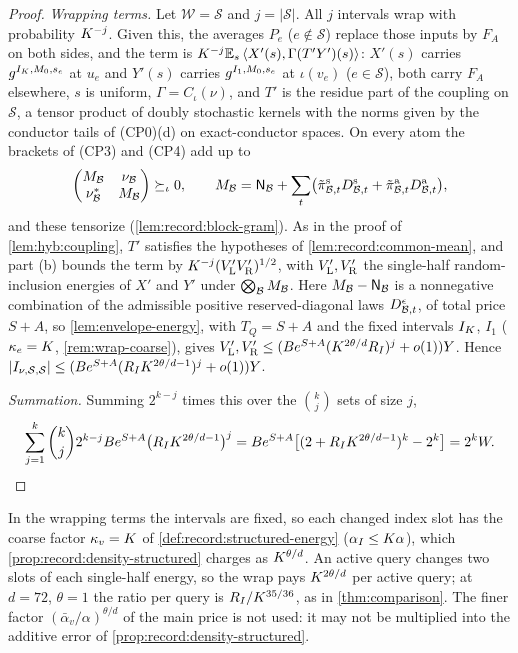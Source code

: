 \begin{proof}
\emph{Wrapping terms.} Let $\mathcal W=\mathcal S$ and $j=|\mathcal S|$. All
$j$ intervals wrap with probability $K^{-j}$. Given this, the averages
$P_e$ ($e\notin\mathcal S$) replace those inputs by $F_A$ on both sides, and
the term is $K^{-j}\mathbb E_s\left\langle X'(s),\Gamma(T'Y')(s)\right\rangle$: $X'(s)$ carries
$g^{I_K,M_0,s_e}$ at $u_e$ and $Y'(s)$ carries $g^{I_1,M_0,s_e}$ at
$\iota(v_e)$ ($e\in\mathcal S$), both carry $F_A$ elsewhere, $s$ is uniform,
$\Gamma=C_\iota(\nu)$, and $T'$ is the residue part of the coupling on
$\mathcal S$, a tensor product of doubly stochastic kernels with the norms
given by the conductor tails of (CP0)(d) on exact-conductor spaces. On every atom the brackets of
(CP3) and (CP4) add up to
\[
 \begin{pmatrix}M_\mathcal B&\nu_\mathcal B\\ \nu_\mathcal B^*&M_\mathcal B\end{pmatrix}
 \succeq_\iota0,\qquad
 M_\mathcal B=\mathsf N_\mathcal B+\sum_t\bigl(\tilde\pi^{\rm s}_{\mathcal B,t}D^{\rm s}_{\mathcal B,t}
 +\tilde\pi^{\rm a}_{\mathcal B,t}D^{\rm a}_{\mathcal B,t}\bigr),
\]
and these tensorize (\cref{lem:record:block-gram}). As in the proof of
\cref{lem:hyb:coupling}, $T'$ satisfies the hypotheses of
\cref{lem:record:common-mean}, and part (b) bounds the term by
$K^{-j}(V'_{\rm L}V'_{\rm R})^{1/2}$, with $V'_{\rm L},V'_{\rm R}$ the
single-half random-inclusion energies of $X'$ and $Y'$ under
$\bigotimes_\mathcal B M_\mathcal B$. Here $M_\mathcal B-\mathsf N_\mathcal B$ is a nonnegative combination of
the admissible positive reserved-diagonal laws $D^\epsilon_{\mathcal B,t}$, of total
price $S+A$, so \cref{lem:envelope-energy}, with $T_Q=S+A$ and the fixed
intervals $I_K$, $I_1$ ($\kappa_e=K$, \cref{rem:wrap-coarse}), gives
$V'_{\rm L},V'_{\rm R}\le(Be^{S+A}(K^{2\theta/d}R_I)^j+o(1))Y$. Hence
$|I_{\nu,\mathcal S,\mathcal S}|\le(Be^{S+A}(R_IK^{2\theta/d-1})^j+o(1))Y$.

\emph{Summation.} Summing $2^{k-j}$ times this over the $\binom kj$ sets of
size $j$,
\[
 \sum_{j=1}^k\binom kj2^{k-j}Be^{S+A}\bigl(R_IK^{2\theta/d-1}\bigr)^j
 =Be^{S+A}\bigl[(2+R_IK^{2\theta/d-1})^k-2^k\bigr]=2^kW .\qedhere
\]
\end{proof}

\begin{remark}
\label{rem:wrap-coarse}
In the wrapping terms the intervals are fixed, so each changed index slot
has the coarse factor $\kappa_v=K$ of \cref{def:record:structured-energy}
($\alpha_I\le K\alpha$), which \cref{prop:record:density-structured} charges
as $K^{\theta/d}$. An active query changes two slots of each single-half
energy, so the wrap pays $K^{2\theta/d}$ per active query; at $d=72$,
$\theta=1$ the ratio per query is $R_I/K^{35/36}$, as in
\cref{thm:comparison}. The finer factor $(\bar\alpha_v/\alpha)^{\theta/d}$ of
the main price is not used: it may not be multiplied into the additive error
of \cref{prop:record:density-structured}.
\end{remark}

